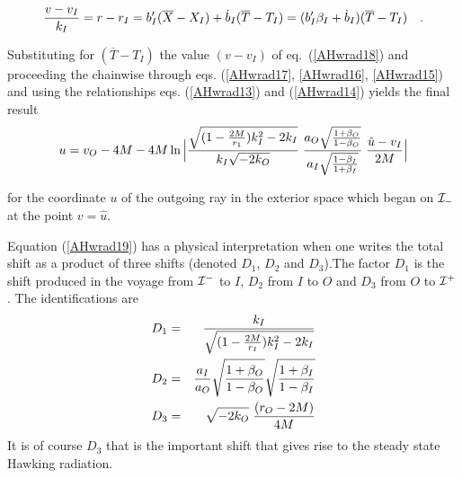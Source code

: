 \documentclass[12pt,oneside]{report}
\def\beq {\begin{equation}}
\def\feq {\end{equation}}
\begin{document}
\beq  {v - v_I \over k_I} = r - r_I = b^\prime _I ( {\overline X} -
X_I) + {\dot b}_I ({\overline T} - T_I) = (b^\prime_I \beta_I + {\dot
b}_I) ({\overline T} - T_I)\quad . \label{AHwrad18} \feq



\noindent Substituting for $ ({\overline T} - T_I)$ the value $
(v - v_I)$ of eq.~(\ref{AHwrad18}) and proceeding the chainwise through eqs.
(\ref{AHwrad17}, \ref{AHwrad16}, \ref{AHwrad15}) and using the 
relationships eqs.
(\ref{AHwrad13})
 and (\ref{AHwrad14})
yields the final result
\beq u = v_O - 4M - 4M \ln 
\Big|   {\sqrt{(1 - {2M \over r_1}) k^2 _I - 2 k_I} \over k_I
\sqrt{-2 k_O}} \; {a_O \sqrt{1 + {\beta}_O \over 1 - {\beta}_O}
\over a_I \sqrt{1 - {\beta}_I \over 1 + {\beta}_I}} \;
 {\hat u - v_I \over 2M}\Big| \label{AHwrad19} \feq



\noindent for the coordinate $u$ of the outgoing ray in the
exterior space which began on $ {\cal I}_-$ at the point $ 
v = {\hat u}$.
\par\noindent Equation (\ref{AHwrad19}) has a physical interpretation when one
writes the total shift as a product of three shifts (denoted
 $D_1$, $ D_2$ and $ D_3$).The factor  $D_1 $ is 
the shift produced in the voyage
from $ {\cal I}^-$ to $I$, $ D_2 $ from $I$ to $O$ and $  D_3 $ from
$O$ to $ {\cal I}^+$. The identifications are
\begin{eqnarray}
  D_1 & = & {{k_I} \over {\sqrt {(1 -{2M \over r_I})k_I^2 - 2 k_I}}}
\nonumber \\
 D_2 & = & {a_I \over a_O} {\sqrt {{1 + {\beta}_O} \over 1 -
\beta_O}}{\sqrt {{1 + {\beta}_I} \over 1 -
\beta_I}}\nonumber \\
 D_3 & = & \sqrt {-2 k_O} \; {(r_O - 2M) \over 4M} \nonumber
\end{eqnarray} 
\noindent It is of course $  D_3 $ that is the important
shift that gives rise to the steady state Hawking radiation.
\end{document}
